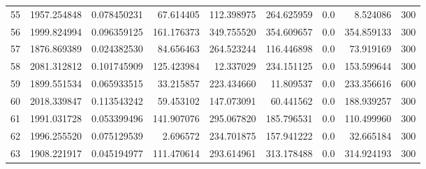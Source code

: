\begin{longtable}{rrrrrrrrr}
55 & 1957.254848 & 0.078450231 & 67.614405 & 112.398975 & 264.625959 & 0.0 & 8.524086 & 300 \\
56 & 1999.824994 & 0.096359125 & 161.176373 & 349.755520 & 354.609657 & 0.0 & 354.859133 & 300 \\
57 & 1876.869389 & 0.024382530 & 84.656463 & 264.523244 & 116.446898 & 0.0 & 73.919169 & 300 \\
58 & 2081.312812 & 0.101745909 & 125.423984 & 12.337029 & 234.151125 & 0.0 & 153.599644 & 300 \\
59 & 1899.551534 & 0.065933515 & 33.215857 & 223.434660 & 11.809537 & 0.0 & 233.356616 & 600 \\
60 & 2018.339847 & 0.113543242 & 59.453102 & 147.073091 & 60.441562 & 0.0 & 188.939257 & 300 \\
61 & 1991.031728 & 0.053399496 & 141.907076 & 295.067820 & 185.796531 & 0.0 & 110.499960 & 300 \\
62 & 1996.255520 & 0.075129539 & 2.696572 & 234.701875 & 157.941222 & 0.0 & 32.665184 & 300 \\
63 & 1908.221917 & 0.045194977 & 111.470614 & 293.614961 & 313.178488 & 0.0 & 314.924193 & 300 \\
\bottomrule
\end{longtable}
